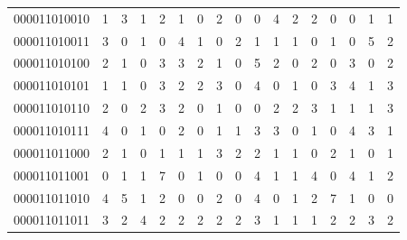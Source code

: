 \documentclass[10pt,a4paper]{article}
\begin{document}
\begin{longtable}{ |c|c|c|c|c|c|c|c|c|c|c|c|c|c|c|c|c| }
    000011010010              & 1                            & 3                                & 1                            & 2                              & 1   & 0   & 2   & 0   & 0   & 4   & 2   & 2   & 0   & 0   & 1   & 1   \\
    000011010011              & 3                            & 0                                & 1                            & 0                              & 4   & 1   & 0   & 2   & 1   & 1   & 1   & 0   & 1   & 0   & 5   & 2   \\
    000011010100              & 2                            & 1                                & 0                            & 3                              & 3   & 2   & 1   & 0   & 5   & 2   & 0   & 2   & 0   & 3   & 0   & 2   \\
    000011010101              & 1                            & 1                                & 0                            & 3                              & 2   & 2   & 3   & 0   & 4   & 0   & 1   & 0   & 3   & 4   & 1   & 3   \\
    000011010110              & 2                            & 0                                & 2                            & 3                              & 2   & 0   & 1   & 0   & 0   & 2   & 2   & 3   & 1   & 1   & 1   & 3   \\
    000011010111              & 4                            & 0                                & 1                            & 0                              & 2   & 0   & 1   & 1   & 3   & 3   & 0   & 1   & 0   & 4   & 3   & 1   \\
    000011011000              & 2                            & 1                                & 0                            & 1                              & 1   & 1   & 3   & 2   & 2   & 1   & 1   & 0   & 2   & 1   & 0   & 1   \\
    000011011001              & 0                            & 1                                & 1                            & 7                              & 0   & 1   & 0   & 0   & 4   & 1   & 1   & 4   & 0   & 4   & 1   & 2   \\
    000011011010              & 4                            & 5                                & 1                            & 2                              & 0   & 0   & 2   & 0   & 4   & 0   & 1   & 2   & 7   & 1   & 0   & 0   \\
    000011011011              & 3                            & 2                                & 4                            & 2                              & 2   & 2   & 2   & 2   & 3   & 1   & 1   & 1   & 2   & 2   & 3   & 2   \\

\end{longtable}
\end{document}

